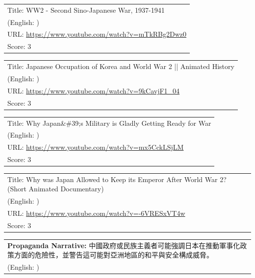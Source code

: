 \documentclass{article}
\begin{document}
\noindent
\begin{tabular}{p{}}
Title: WW2 - Second Sino-Japanese War, 1937-1941 \\
(English: ) \\
URL: \url{https://www.youtube.com/watch?v=mTkRBg2Dwz0} \\
Score: 3 \\
\end{tabular}
\vspace{0.5em}

\noindent
\begin{tabular}{p{}}
Title: Japanese Occupation of Korea and World War 2 || Animated History \\
(English: ) \\
URL: \url{https://www.youtube.com/watch?v=9kCavjF1_04} \\
Score: 3 \\
\end{tabular}
\vspace{0.5em}

\noindent
\begin{tabular}{p{}}
Title: Why Japan\&\#39;s Military is Gladly Getting Ready for War \\
(English: ) \\
URL: \url{https://www.youtube.com/watch?v=mx5CckLSjLM} \\
Score: 3 \\
\end{tabular}
\vspace{0.5em}

\noindent
\begin{tabular}{p{}}
Title: Why was Japan Allowed to Keep its Emperor After World War 2? (Short Animated Documentary) \\
(English: ) \\
URL: \url{https://www.youtube.com/watch?v=-6VRESxVT4w} \\
Score: 3 \\
\end{tabular}
\vspace{0.5em}

\vspace{1em}
\noindent
\begin{tabular}{p{}}
\textbf{Propaganda Narrative:} 中國政府或民族主義者可能強調日本在推動軍事化政策方面的危險性，並警告這可能對亞洲地區的和平與安全構成威脅。 \\
(English: ) \\
\end{tabular}
\end{document}
